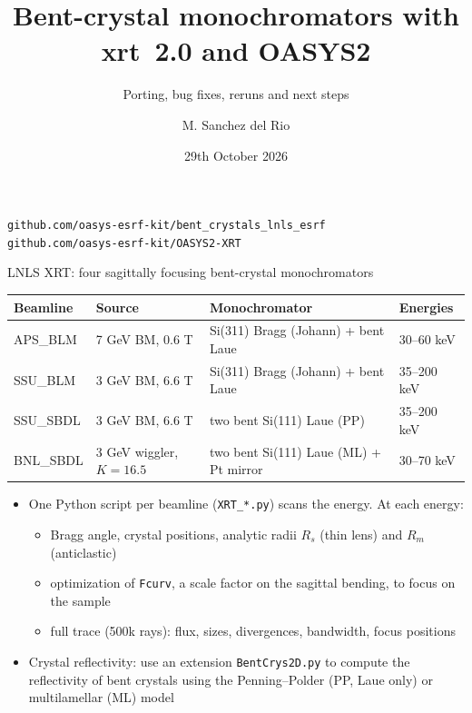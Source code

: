 \documentclass[aspectratio=169,10pt]{beamer}
\title{Bent-crystal monochromators with xrt~2.0 and OASYS2}
\subtitle{Porting, bug fixes, reruns and next steps}
\author{M. Sanchez del Rio}
\date{29th October 2026}
\begin{document}
\begin{frame}
  \titlepage
  \centering\small
  \texttt{github.com/oasys-esrf-kit/bent\_crystals\_lnls\_esrf}\\
  \texttt{github.com/oasys-esrf-kit/OASYS2-XRT}
\end{frame}

\begin{frame}{LNLS XRT: four sagittally focusing bent-crystal monochromators}
  \small
  \begin{tabular}{@{}llll@{}}
    \toprule
    Beamline & Source & Monochromator & Energies \\
    \midrule
    APS\_BLM  & 7 GeV BM, 0.6 T            & Si(311) Bragg (Johann) + bent Laue & 30--60 keV \\
    SSU\_BLM  & 3 GeV BM, 6.6 T            & Si(311) Bragg (Johann) + bent Laue & 35--200 keV \\
    SSU\_SBDL & 3 GeV BM, 6.6 T            & two bent Si(111) Laue (PP)         & 35--200 keV \\
    BNL\_SBDL & 3 GeV wiggler, $K=16.5$    & two bent Si(111) Laue (ML) + Pt mirror & 30--70 keV \\
    \bottomrule
  \end{tabular}

  \vspace{1em}
  \begin{itemize}
    \item One Python script per beamline (\texttt{XRT\_*.py}) scans the energy. At each energy:
      \begin{itemize}
        \item Bragg angle, crystal positions, analytic radii $R_s$ (thin lens) and $R_m$ (anticlastic)
        \item optimization of \texttt{Fcurv}, a scale factor on the sagittal bending, to focus on the sample
        \item full trace (500k rays): flux, sizes, divergences, bandwidth, focus positions
      \end{itemize}
    \item Crystal reflectivity: use an extension \texttt{BentCrys2D.py} to compute the reflectivity of bent crystals
      using the Penning--Polder (PP, Laue only) or multilamellar (ML) model
  \end{itemize}
\end{frame}
\end{document}

